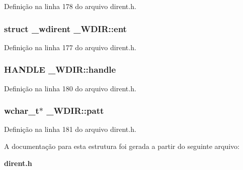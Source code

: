 Definição na linha 178 do arquivo dirent.\+h.

\subsubsection[{ent}]{\setlength{\rightskip}{0pt plus 5cm}struct {\bf \+\_\+wdirent} \+\_\+\+W\+D\+I\+R\+::ent}\label{struct___w_d_i_r_a84ae1457352005f813ed4b3dc1994b62}


Definição na linha 177 do arquivo dirent.\+h.

\subsubsection[{handle}]{\setlength{\rightskip}{0pt plus 5cm}H\+A\+N\+D\+LE \+\_\+\+W\+D\+I\+R\+::handle}\label{struct___w_d_i_r_a694510e166fd3e797b3e15b9e4b3810a}


Definição na linha 180 do arquivo dirent.\+h.

\subsubsection[{patt}]{\setlength{\rightskip}{0pt plus 5cm}wchar\+\_\+t$\ast$ \+\_\+\+W\+D\+I\+R\+::patt}\label{struct___w_d_i_r_a700ff3a1096fb36452c571b0f55b4e60}


Definição na linha 181 do arquivo dirent.\+h.



A documentação para esta estrutura foi gerada a partir do seguinte arquivo\+:\begin{DoxyCompactItemize}
\item 
{\bf dirent.\+h}\end{DoxyCompactItemize}
